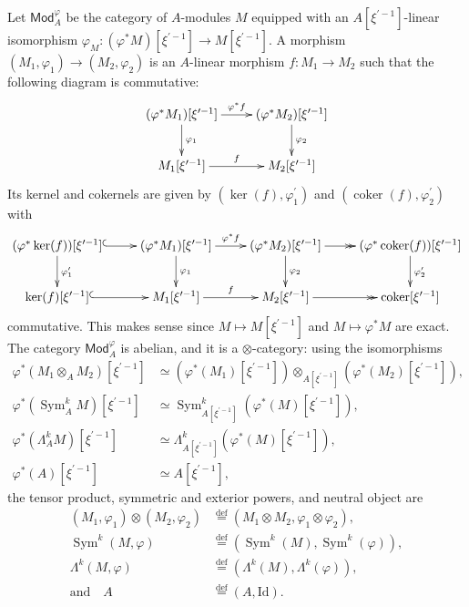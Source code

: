 \documentclass[11pt]{article}
\theoremstyle{definition}
\numberwithin{equation}{section}
\numberwithin{figure}{section}
\numberwithin{table}{section}
\newcommand{\Mod}{\mathsf{Mod}}
\DeclareMathOperator{\coker}{coker}
\DeclareMathOperator{\Sym}{Sym}
\newcommand{\eqd}{\stackrel{\mathrm{def}}{=}}
\begin{document}
Let $\Mod_{A}^{\varphi}$ be the category of $A$-modules $M$ equipped with an $A[\xi^{\prime-1}]$-linear isomorphism $\varphi_{M}:(\varphi^{\ast}M)[\xi^{\prime-1}]\rightarrow M[\xi^{\prime-1}]$. A morphism $(M_{1},\varphi_{1})\rightarrow(M_{2},\varphi_{2})$ is an $A$-linear morphism $f:M_{1}\rightarrow M_{2}$ such that the following diagram is commutative:
\[
\xymatrix@R=2pc{(\varphi^{\ast}M_{1})[\xi^{\prime-1}]\ar[r]^{\varphi^{\ast}f}\ar[d]^{\varphi_{1}} & (\varphi^{\ast}M_{2})[\xi^{\prime-1}]\ar[d]^{\varphi_{2}}\\
M_{1}[\xi^{\prime-1}]\ar[r]^{f} & M_{2}[\xi^{\prime-1}] }
\]
Its kernel and cokernels are given by $\left(\ker(f),\varphi_{1}^{\prime}\right)$ and $\left(\coker(f),\varphi_{2}^{\prime}\right)$ with
\[
\xymatrix{(\varphi^{\ast}\ker(f))[\xi^{\prime-1}]\ar@{^{(}->}[r]\ar[d]^{\varphi_{1}^{\prime}} & (\varphi^{\ast}M_{1})[\xi^{\prime-1}]\ar[r]^{\varphi^{\ast}f}\ar[d]^{\varphi_{1}} & (\varphi^{\ast}M_{2})[\xi^{\prime-1}]\ar[d]^{\varphi_{2}}\ar@{->>}[r] & (\varphi^{\ast}\coker(f))[\xi^{\prime-1}]\ar[d]^{\varphi_{2}^{\prime}}\\
\ker(f)[\xi^{\prime-1}]\ar@{^{(}->}[r] & M_{1}[\xi^{\prime-1}]\ar[r]^{f} & M_{2}[\xi^{\prime-1}]\ar@{->>}[r] & \coker[\xi^{\prime-1}] }
\]
commutative. This makes sense since $M\mapsto M[\xi^{\prime-1}]$ and $M\mapsto\varphi^{\ast}M$ are exact. The category $\Mod_{A}^{\varphi}$ is abelian, and it is a $\otimes$-category: using the isomorphisms
\begin{align*}
\varphi^{\ast}(M_{1}\otimes_{A}M_{2})\left[\xi^{\prime-1}\right] & \simeq \left(\varphi^{\ast}(M_{1})\left[\xi^{\prime-1}\right]\right)\otimes_{A\left[\xi^{\prime-1}\right]}\left(\varphi^{\ast}(M_{2})\left[\xi^{\prime-1}\right]\right),\\
\varphi^{\ast}\left(\Sym_{A}^{k}M\right)\left[\xi^{\prime-1}\right] & \simeq \Sym_{A\left[\xi^{\prime-1}\right]}^{k}\left(\varphi^{\ast}\left(M\right)\left[\xi^{\prime-1}\right]\right),\\
\varphi^{\ast}\left(\Lambda_{A}^{k}M\right)\left[\xi^{\prime-1}\right] & \simeq \Lambda_{A\left[\xi^{\prime-1}\right]}^{k}\left(\varphi^{\ast}\left(M\right)\left[\xi^{\prime-1}\right]\right),\\
\varphi^{\ast}(A)\left[\xi^{\prime-1}\right] & \simeq A\left[\xi^{\prime-1}\right],
\end{align*}
the tensor product, symmetric and exterior powers, and neutral object are
\begin{align*}
(M_{1},\varphi_{1})\otimes(M_{2},\varphi_{2}) & \eqd \left(M_{1}\otimes M_{2},\varphi_{1}\otimes\varphi_{2}\right),\\
\Sym^{k}(M,\varphi) & \eqd \left(\Sym^{k}(M),\Sym^{k}(\varphi)\right),\\
\Lambda^{k}(M,\varphi) & \eqd \left(\Lambda^{k}(M),\Lambda^{k}(\varphi)\right),\\
\text{and}\quad A & \eqd (A,\mathrm{Id}).
\end{align*}
\end{document}
